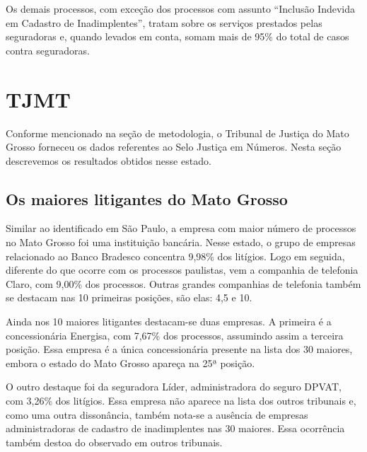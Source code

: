 \documentclass[]{report}
\begin{document}
Os demais processos, com exceção dos processos com assunto ``Inclusão
Indevida em Cadastro de Inadimplentes'', tratam sobre os serviços
prestados pelas seguradoras e, quando levados em conta, somam mais de
95\% do total de casos contra seguradoras.

\section{TJMT}\label{tjmt}

Conforme mencionado na seção de metodologia, o Tribunal de Justiça do
Mato Grosso forneceu os dados referentes ao Selo Justiça em Números.
Nesta seção descrevemos os resultados obtidos nesse estado.

\subsection{Os maiores litigantes do Mato
Grosso}\label{os-maiores-litigantes-do-mato-grosso}

Similar ao identificado em São Paulo, a empresa com maior número de
processos no Mato Grosso foi uma instituição bancária. Nesse estado, o
grupo de empresas relacionado ao Banco Bradesco concentra 9,98\% dos
litígios. Logo em seguida, diferente do que ocorre com os processos
paulistas, vem a companhia de telefonia Claro, com 9,00\% dos processos.
Outras grandes companhias de telefonia também se destacam nas 10
primeiras posições, são elas: 4,5 e 10.

Ainda nos 10 maiores litigantes destacam-se duas empresas. A primeira é
a concessionária Energisa, com 7,67\% dos processos, assumindo assim a
terceira posição. Essa empresa é a única concessionária presente na
lista dos 30 maiores, embora o estado do Mato Grosso apareça na 25ª
posição.

O outro destaque foi da seguradora Líder, administradora do seguro
DPVAT, com 3,26\% dos litígios. Essa empresa não aparece na lista dos
outros tribunais e, como uma outra dissonância, também nota-se a
ausência de empresas administradoras de cadastro de inadimplentes nas 30
maiores. Essa ocorrência também destoa do observado em outros tribunais.
\end{document}

